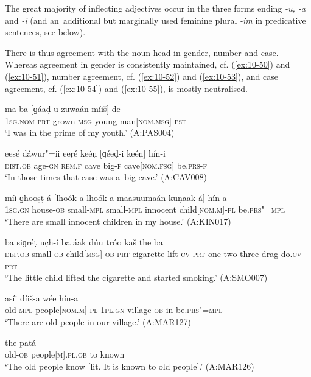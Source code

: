 The great majority of inflecting adjectives occur in the three forms ending \textit{-u, -a} and \textit{-i} (and an~additional but marginally used feminine plural \textit{-im} in predicative sentences, see  below).


There is thus agreement with the noun head in gender, number and case. Whereas agreement in gender is consistently maintained, cf. (\ref{ex:10-50}) and (\ref{ex:10-51}), number agreement, cf. (\ref{ex:10-52}) and (\ref{ex:10-53}), and case agreement, cf. (\ref{ex:10-54}) and (\ref{ex:10-55}), is mostly neutralised. 

\begin{exe}
\ex
\label{ex:10-50}
\gll ma ba [ɡáaḍ-u zuwaán míiš] de \\
\textsc{1sg.nom} \textsc{prt} grown-\textsc{msg} young man[\textsc{nom}.\textsc{msg}] \textsc{pst} \\
\glt `I was in the prime of my youth.' (A:PAS004)

\ex
\label{ex:10-51}
\gll eesé dáwur"=ii eeṛé keéṇ [ɡéeḍ-i keéṇ] hín-i \\
\textsc{dist.ob} age-\textsc{gn} \textsc{rem.f} cave big-\textsc{f} cave[\textsc{nom}.\textsc{fsg}] be.\textsc{prs-f} \\
\glt `In those times that case was a~big cave.' (A:CAV008)

\ex
\label{ex:10-52}
\gll míi ɡhooṣṭ-á [lhoók-a lhoók-a maasuumaán kuṇaak-á] hín-a \\
\textsc{1sg.gn} house-\textsc{ob} small-\textsc{mpl} small-\textsc{mpl}  innocent child[\textsc{nom.m}]-\textsc{pl} be.\textsc{prs"=mpl} \\
\glt `There are small innocent children in my house.' (A:KIN017)

\ex
\label{ex:10-53}
 ba siɡréṭ uc̣h-í ba áak dúu tróo kaš the ba \\
\textsc{def.ob} small-\textsc{ob} child[\textsc{msg}]-\textsc{ob} \textsc{prt} cigarette lift-\textsc{cv} \textsc{prt } one two three drag do.\textsc{cv} \textsc{prt}  \\
\glt `The little child lifted the cigarette and started smoking.' (A:SMO007)

\ex
\label{ex:10-54}
 asíi díiš-a wée hín-a \\
old-\textsc{mpl} people[\textsc{nom.m}]-\textsc{pl} \textsc{1pl.gn} village-\textsc{ob} in be.\textsc{prs"=mpl} \\
\glt `There are old people in our village.' (A:MAR127)

\ex
\label{ex:10-55}
 the patá \\
old-\textsc{ob} people[\textsc{m}].\textsc{pl.ob} to known \\
\glt `The old people know [lit. It is known to old people].' (A:MAR126)
\end{exe}


